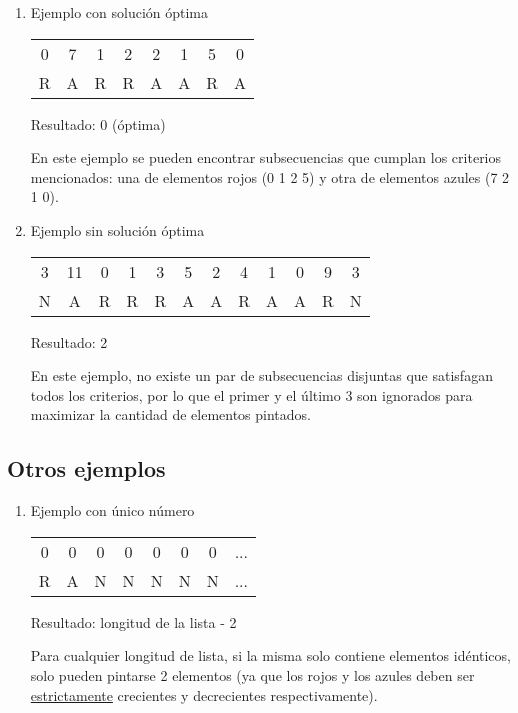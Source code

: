 	\begin{enumerate}
		\item Ejemplo con solución óptima

		\begin{tabular}{ c c c c c c c c }
			0 & 7 & 1 & 2 & 2 & 1 & 5 & 0 \\
			R & A & R & R & A & A & R & A \\
		\end{tabular}

		Resultado: 0 (óptima)

		En este ejemplo se pueden encontrar subsecuencias que cumplan los criterios mencionados: una de elementos rojos (0 1 2 5) y otra de elementos azules (7 2 1 0).

		\item Ejemplo sin solución óptima

		\begin{tabular}{ c c c c c c c c c c c c }
			3 & 11 & 0 & 1 & 3 & 5 & 2 & 4 & 1 & 0 & 9 & 3 \\
			N & A & R & R & R & A & A & R & A & A & R & N \\
		\end{tabular}

		Resultado: 2

		En este ejemplo, no existe un par de subsecuencias disjuntas que satisfagan todos los criterios, por lo que el primer y el último 3 son ignorados para maximizar la cantidad de elementos pintados.
	\end{enumerate}

	\subsection{Otros ejemplos}

	\begin{enumerate}
		\item Ejemplo con único número

		\begin{tabular}{ c c c c c c c c }
			0 & 0 & 0 & 0 & 0 & 0 & 0 & ... \\
			R & A & N & N & N & N & N & ... \\
		\end{tabular}

		Resultado: longitud de la lista - 2

		Para cualquier longitud de lista, si la misma solo contiene elementos idénticos, solo pueden pintarse 2 elementos (ya que los rojos y los azules deben ser \underline{estrictamente} crecientes y decrecientes respectivamente).
	\end{enumerate}

